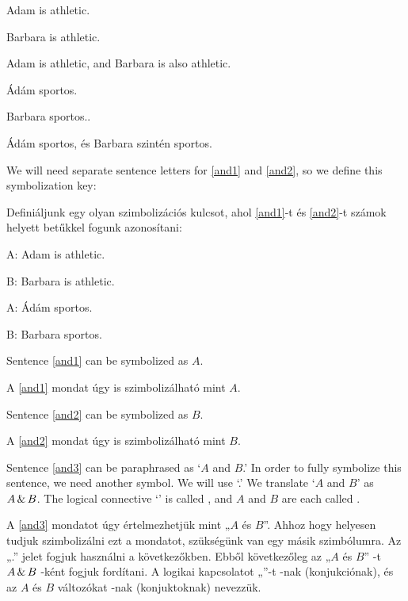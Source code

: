 \begin{earg}
\item[\ex{and1}]Adam is athletic.
\item[\ex{and2}]Barbara is athletic.
\item[\ex{and3}]Adam is athletic, and Barbara is also athletic.
\end{earg}

\begin{earg}
\item[\ex{and1}]Ádám sportos.
\item[\ex{and2}]Barbara sportos..
\item[\ex{and3}]Ádám sportos, és Barbara szintén sportos.
\end{earg}

We will need separate sentence letters for \ref{and1} and \ref{and2}, so we define this symbolization key:

Definiáljunk egy olyan szimbolizációs kulcsot, ahol \ref{and1}-t és \ref{and2}-t számok helyett betűkkel fogunk azonosítani:

\begin{ekey}
\item[A:] Adam is athletic.
\item[B:] Barbara is athletic.
\end{ekey}

\begin{ekey}
\item[A:] Ádám sportos.
\item[B:] Barbara sportos.
\end{ekey}

Sentence \ref{and1} can be symbolized as $A$.

A \ref{and1} mondat úgy is szimbolizálható mint $A$.

Sentence \ref{and2} can be symbolized as $B$.

A \ref{and2} mondat úgy is szimbolizálható mint $B$.

Sentence \ref{and3} can be paraphrased as `$A$ and $B$.'
In order to fully symbolize this sentence, we need another symbol. We will use `\eand.' 
We translate `$A$ and $B$' as $A\,\&\, B$.
The logical connective `\eand' is called , and $A$ and $B$ are each called .


A \ref{and3} mondatot úgy értelmezhetjük mint „$A$ és $B$”. 
Ahhoz hogy helyesen tudjuk szimbolizálni ezt a mondatot, szükségünk van egy másik szimbólumra. Az „\eand.” jelet fogjuk használni a következőkben. 
Ebből következőleg az „$A$ és $B$” -t  $A\,\&\, B$ -ként fogjuk fordítani. 
A logikai kapcsolatot „\eand”-t -nak (konjukciónak), és az $A$ és $B$  változókat  -nak (konjuktoknak) nevezzük.



